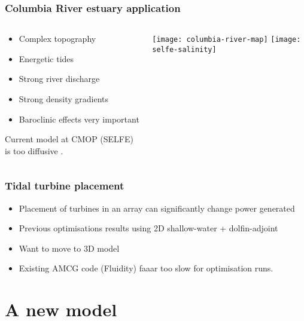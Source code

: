 \documentclass{beamer}
\begin{document}
\begin{frame}[t]
  \frametitle{Columbia River estuary application}
  \begin{columns}[t]
  \begin{column}{0.5\textwidth}
    \begin{itemize}
    \item Complex topography
    \item Energetic tides
    \item Strong river discharge
    \item Strong density gradients
    \item Baroclinic effects very important
    \end{itemize}
    Current model at CMOP (SELFE) is too diffusive \parencite{Karna:2015}.
  \end{column}
  \hspace*{-2em}
  \begin{column}{0.6\textwidth}
    \begin{center}
      \vspace{-2em}
      \texttt{[image: columbia-river-map]}
      \vspace{1em}
      \texttt{[image: selfe-salinity]}
    \end{center}
  \end{column}
\end{columns}
\end{frame}

\begin{frame}
  \frametitle{Tidal turbine placement}
  \begin{itemize}
  \item Placement of turbines in an array can significantly change
    power generated
  \item Previous optimisations results using 2D shallow-water +
    dolfin-adjoint
  \item Want to move to 3D model
  \item Existing AMCG code (Fluidity) faaar too slow for optimisation
    runs.
  \end{itemize}
\end{frame}
\section{A new model}
\end{document}

